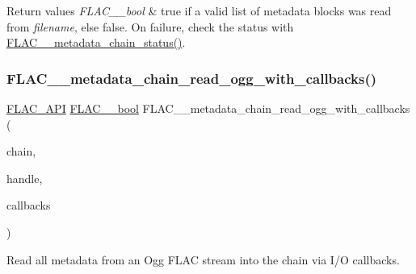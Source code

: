\begin{DoxyRetVals}{Return values}
{\em F\+L\+A\+C\+\_\+\+\_\+bool} & {\ttfamily true} if a valid list of metadata blocks was read from {\itshape filename}, else {\ttfamily false}. On failure, check the status with \hyperlink{group__flac__metadata__level2_ga3d030e216a6517f23372bb76f0639127}{F\+L\+A\+C\+\_\+\+\_\+metadata\+\_\+chain\+\_\+status()}. \\
\hline
\end{DoxyRetVals}
\mbox{\label{group__flac__metadata__level2_ga62c24f8d127897e5b7d00aa48f889996}} 
\subsubsection{\texorpdfstring{F\+L\+A\+C\+\_\+\+\_\+metadata\+\_\+chain\+\_\+read\+\_\+ogg\+\_\+with\+\_\+callbacks()}{FLAC\_\_metadata\_chain\_read\_ogg\_with\_callbacks()}}
{\footnotesize\ttfamily \hyperlink{group__flac__export_ga56ca07df8a23310707732b1c0007d6f5}{F\+L\+A\+C\+\_\+\+A\+PI} \hyperlink{ordinals_8h_a95103469f1cbd78b8cf250194985b34e}{F\+L\+A\+C\+\_\+\+\_\+bool} F\+L\+A\+C\+\_\+\+\_\+metadata\+\_\+chain\+\_\+read\+\_\+ogg\+\_\+with\+\_\+callbacks (\begin{DoxyParamCaption}\item[{\hyperlink{group__flac__metadata__level2_gaec6993c60b88f222a52af86f8f47bfdf}{F\+L\+A\+C\+\_\+\+\_\+\+Metadata\+\_\+\+Chain} $\ast$}]{chain,  }\item[{\hyperlink{group__flac__callbacks_ga4c329c3168dee6e352384c5e9306260d}{F\+L\+A\+C\+\_\+\+\_\+\+I\+O\+Handle}}]{handle,  }\item[{\hyperlink{struct_f_l_a_c_____i_o_callbacks}{F\+L\+A\+C\+\_\+\+\_\+\+I\+O\+Callbacks}}]{callbacks }\end{DoxyParamCaption})}

Read all metadata from an Ogg F\+L\+AC stream into the chain via I/O callbacks.

